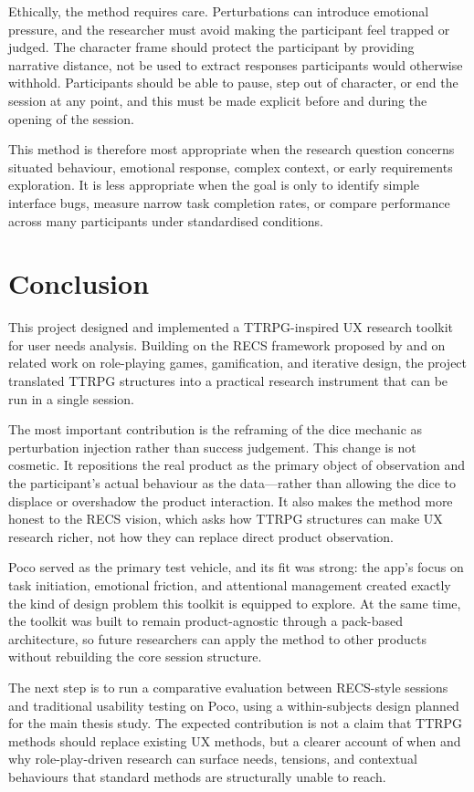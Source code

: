 \documentclass[12pt,a4paper]{report}
\begin{document}
Ethically, the method requires care.
Perturbations can introduce emotional pressure, and the researcher must avoid making the
participant feel trapped or judged.
The character frame should protect the participant by providing narrative distance, not
be used to extract responses participants would otherwise withhold.
Participants should be able to pause, step out of character, or end the session at any
point, and this must be made explicit before and during the opening of the session.

This method is therefore most appropriate when the research question concerns situated
behaviour, emotional response, complex context, or early requirements exploration.
It is less appropriate when the goal is only to identify simple interface bugs, measure
narrow task completion rates, or compare performance across many participants under
standardised conditions.

\chapter{Conclusion}

This project designed and implemented a TTRPG-inspired UX research toolkit for user
needs analysis.
Building on the RECS framework proposed by \citet{sturdee2023ttrpg} and on related work
on role-playing games, gamification, and iterative design, the project translated TTRPG
structures into a practical research instrument that can be run in a single session.

The most important contribution is the reframing of the dice mechanic as perturbation
injection rather than success judgement.
This change is not cosmetic.
It repositions the real product as the primary object of observation and the
participant's actual behaviour as the data---rather than allowing the dice to displace or
overshadow the product interaction.
It also makes the method more honest to the RECS vision, which asks how TTRPG structures
can make UX research richer, not how they can replace direct product observation.

Poco served as the primary test vehicle, and its fit was strong: the app's focus on task
initiation, emotional friction, and attentional management created exactly the kind of
design problem this toolkit is equipped to explore.
At the same time, the toolkit was built to remain product-agnostic through a pack-based
architecture, so future researchers can apply the method to other products without
rebuilding the core session structure.

The next step is to run a comparative evaluation between RECS-style sessions and
traditional usability testing on Poco, using a within-subjects design planned for the
main thesis study.
The expected contribution is not a claim that TTRPG methods should replace existing UX
methods, but a clearer account of when and why role-play-driven research can surface
needs, tensions, and contextual behaviours that standard methods are structurally unable
to reach.



\end{document}
